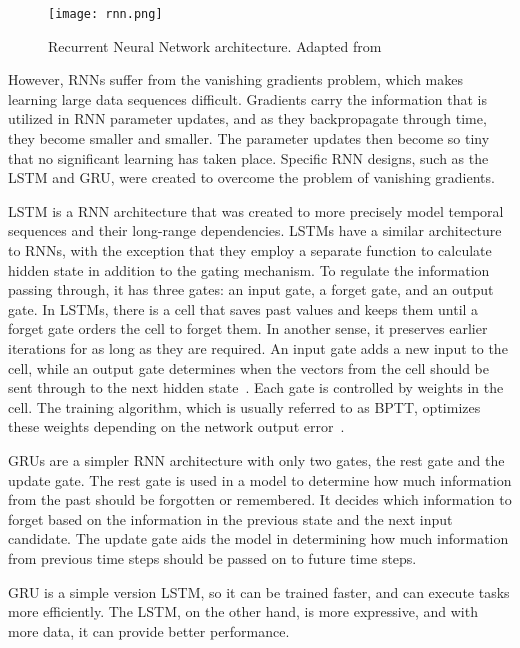 \begin{figure}[htbp]
    \centering
    \texttt{[image: rnn.png]}
    \caption{Recurrent Neural Network architecture. Adapted from~\cite{Gupta2017RecurrentLearning}}
    \label{fig:rnn}
\end{figure}

However, \gls{RNN}s suffer from the vanishing gradients problem, which makes learning large data sequences difficult. Gradients carry the information that is utilized in \gls{RNN} parameter updates, and as they backpropagate through time, they become smaller and smaller. The parameter updates then become so tiny that no significant learning has taken place. Specific \gls{RNN} designs, such as the \gls{LSTM} and \gls{GRU}, were created to overcome the problem of vanishing gradients.

\gls{LSTM} is a \gls{RNN} architecture that was created to more precisely model temporal sequences and their long-range dependencies. \gls{LSTM}s have a similar architecture to RNNs, with the exception that they employ a separate function to calculate hidden state in addition to the gating mechanism. To regulate the information passing through, it has three gates: an input gate, a forget gate, and an output gate. In \gls{LSTM}s, there is a cell that saves past values and keeps them until a forget gate orders the cell to forget them. In another sense, it preserves earlier iterations for as long as they are required. An input gate adds a new input to the cell, while an output gate determines when the vectors from the cell should be sent through to the next hidden state~\cite{Khan2019RNN-LSTM-GRUTransformation}. Each gate is controlled by weights in the cell. The training algorithm, which is usually referred to as \gls{BPTT}, optimizes these weights depending on the network output error~\cite{Madhavan2021DeepDeveloper}.

\gls{GRU}s are a simpler \gls{RNN} architecture with only two gates, the rest gate and the update gate. The rest gate is used in a model to determine how much information from the past should be forgotten or remembered. It decides which information to forget based on the information in the previous state and the next input candidate. The update gate aids the model in determining how much information from previous time steps should be passed on to future time steps.

\gls{GRU} is a simple version \gls{LSTM}, so it can be trained faster, and can execute tasks more efficiently. The \gls{LSTM}, on the other hand, is more expressive, and with more data, it can provide better performance.


